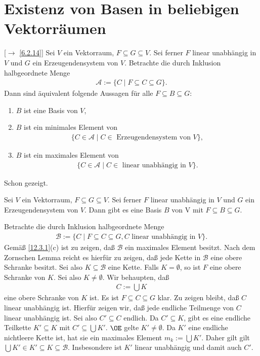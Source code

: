 \documentclass[../../main.tex]{subfiles}
\begin{document}
\section{Existenz von Basen in beliebigen Vektorräumen}
\begin{sat}\label{12.3.1}
	[$\to$ \ref{6.2.14}] 
	Sei $V$ ein Vektorraum, $F\subseteq G\subseteq V$. Sei ferner $F$ linear unabhängig in $V$ und $G$ ein 	Erzeugendensystem von $V$. Betrachte die durch Inklusion halbgeordnete Menge
	\begin{align*}
		\mathcal{A}:=\{C\mid F\subseteq C\subseteq G\}.
	\end{align*}
	Dann sind äquivalent folgende Aussagen für alle $F\subseteq B\subseteq G$:
	\begin{enumerate}[\normalfont (a)]
		\item $B$ ist eine Basis von $V$,
		\item $B$ ist ein minimales Element von
		\begin{align*}
			\{C\in \mathcal{A}\mid C\in\text{ Erzeugendensystem von } V\},
		\end{align*}
		\item $B$ ist ein maximales Element von
		\begin{align*}
			\{C\in \mathcal{A}\mid C\in\text{ linear unabhängig in } V\}.
		\end{align*}
	\end{enumerate}
\end{sat}
\begin{cproof}
	Schon gezeigt.
\end{cproof}

\begin{kor}\label{12.3.2}
	Sei $V$ ein Vektorraum, $F\subseteq G\subseteq V$. Sei ferner $F$ linear unabhängig in $V$ und $G$ ein Erzeugendensystem von $V$. Dann gibt es eine Basis $B$ von V mit $F\subseteq B\subseteq G$.
\end{kor}
\begin{cproof}
	Betrachte die durch Inklusion halbgeordnete Menge
	\begin{align*}
		\mathcal{B}:=\{C\mid F\subseteq C\subseteq G, C\text{ linear unabhängig in }V\}.
	\end{align*}
	Gemäß \ref{12.3.1}(c) ist zu zeigen, daß $\mathcal{B}$ ein maximales Element besitzt. Nach dem Zornschen Lemma reicht es hierfür zu zeigen, daß jede Kette in $\mathcal{B}$ eine obere Schranke besitzt. Sei also $K\subseteq \mathcal{B}$ eine Kette. Falls $K=\emptyset$, so ist $F$ eine obere Schranke von $K$. Sei also $K\neq \emptyset$. Wir behaupten, daß
	\begin{align*}
		C:=\bigcup K
	\end{align*}
	eine obere Schranke von $K$ ist. Es ist $F\subseteq C\subseteq G$ klar. Zu zeigen bleibt, daß $C$ linear unabhängig ist. Hierfür zeigen wir, daß jede endliche Teilmenge von $C$ linear unabhängig ist. Sei also $C'\subseteq C$ endlich. Da $C'\subseteq K$, gibt es eine endliche Teilkette $K'\subseteq K$ mit $C'\subseteq \bigcup K'$. $\OE$ gelte $K'\neq \emptyset$. Da $K'$ eine endliche nichtleere Kette ist, hat sie ein maximales Element $m_k:=\bigcup K'$. Daher gilt gilt $\bigcup K'\in K'\subseteq K\subseteq \mathcal{B}$. Insbesondere ist $K'$ linear unabhängig und damit auch $C'$.
\end{cproof}
\end{document}
